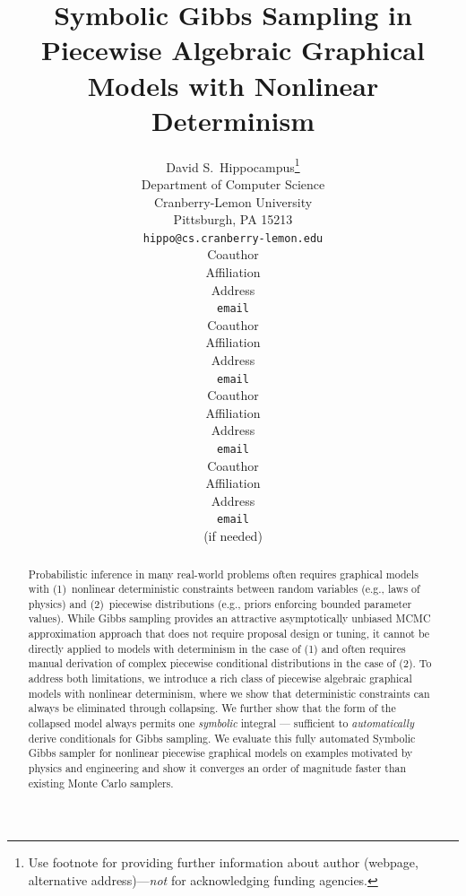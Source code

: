 \documentclass{article} %
\title{Symbolic Gibbs Sampling in\\ Piecewise Algebraic Graphical Models with Nonlinear Determinism}
\author{
David S.~Hippocampus\thanks{ Use footnote for providing further information
about author (webpage, alternative address)---\emph{not} for acknowledging
funding agencies.} \\
Department of Computer Science\\
Cranberry-Lemon University\\
Pittsburgh, PA 15213 \\
\texttt{hippo@cs.cranberry-lemon.edu} \\
\And
Coauthor \\
Affiliation \\
Address \\
\texttt{email} \\
\AND
Coauthor \\
Affiliation \\
Address \\
\texttt{email} \\
\And
Coauthor \\
Affiliation \\
Address \\
\texttt{email} \\
\And
Coauthor \\
Affiliation \\
Address \\
\texttt{email} \\
(if needed)\\
}
\begin{document}
\maketitle

\begin{abstract}
Probabilistic inference in many real-world problems often requires
graphical models with (1)~nonlinear deterministic constraints between
random variables (e.g., laws of physics) and (2)~piecewise
distributions (e.g., priors enforcing bounded parameter values).
While Gibbs sampling provides an attractive asymptotically unbiased
MCMC approximation approach that does not require proposal design or
tuning, it cannot be directly applied to models with determinism in
the case of (1) and often requires manual derivation of complex
piecewise conditional distributions in the case of (2).  To address
both limitations, we introduce a rich class of piecewise algebraic
graphical models with nonlinear determinism, where we show that
deterministic constraints can always be eliminated through collapsing.
We further show that the form of the collapsed model always permits
one \emph{symbolic} integral --- sufficient to \emph{automatically}
derive conditionals for Gibbs sampling.  We evaluate this fully
automated Symbolic Gibbs sampler for nonlinear piecewise graphical
models on examples motivated by physics and engineering and show it
converges an order of magnitude faster than existing Monte Carlo
samplers.

\end{abstract}
\end{document}
